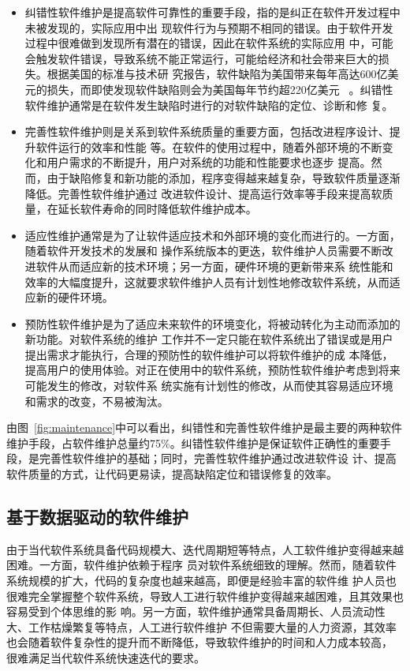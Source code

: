 \begin{itemize}
  \item 纠错性软件维护是提高软件可靠性的重要手段，指的是纠正在软件开发过程中未被发现的，实际应用中出
现软件行为与预期不相同的错误。由于软件开发过程中很难做到发现所有潜在的错误，因此在软件系统的实际应用
中，可能会触发软件错误，导致系统不能正常运行，可能给经济和社会带来巨大的损失。根据美国的标准与技术研
究报告，软件缺陷为美国带来每年高达600亿美元的损失，而即使发现软件缺陷则会为美国每年节约超220亿美元
~\cite{strate2013literature}。纠错性软件维护通常是在软件发生缺陷时进行的对软件缺陷的定位、诊断和修
复。
  \item 完善性软件维护则是关系到软件系统质量的重要方面，包括改进程序设计、提升软件运行的效率和性能
等。在软件的使用过程中，随着外部环境的不断变化和用户需求的不断提升，用户对系统的功能和性能要求也逐步
提高。然而，由于缺陷修复和新功能的添加，程序变得越来越复杂，导致软件质量逐渐降低。完善性软件维护通过
改进软件设计、提高运行效率等手段来提高软质量，在延长软件寿命的同时降低软件维护成本。
  \item 适应性维护通常是为了让软件适应技术和外部环境的变化而进行的。一方面，随着软件开发技术的发展和
操作系统版本的更迭，软件维护人员需要不断改进软件从而适应新的技术环境；另一方面，硬件环境的更新带来系
统性能和效率的大幅度提升，这就要求软件维护人员有计划性地修改软件系统，从而适应新的硬件环境。
  \item 预防性软件维护是为了适应未来软件的环境变化，将被动转化为主动而添加的新功能。对软件系统的维护
工作并不一定只能在软件系统出了错误或是用户提出需求才能执行，合理的预防性的软件维护可以将软件维护的成
本降低，提高用户的使用体验。对正在使用中的软件系统，预防性软件维护考虑到将来可能发生的修改，对软件系
统实施有计划性的修改，从而使其容易适应环境和需求的改变，不易被淘汰。
\end{itemize}

由图~\ref{fig:maintenance}中可以看出，纠错性和完善性软件维护是最主要的两种软件维护手段，占软件维护总量约75\%。纠错性软件维护是保证软件正确性的重要手段，是完善性软件维护的基础；同时，完善性软件维护通过改进软件设
计、提高软件质量的方式，让代码更易读，提高缺陷定位和错误修复的效率。

\subsection{基于数据驱动的软件维护}
由于当代软件系统具备代码规模大、迭代周期短等特点，人工软件维护变得越来越困难。一方面，软件维护依赖于程序
员对软件系统细致的理解。然而，随着软件系统规模的扩大，代码的复杂度也越来越高，即便是经验丰富的软件维
护人员也很难完全掌握整个软件系统，导致人工进行软件维护变得越来越困难，且其效果也容易受到个体思维的影
响。另一方面，软件维护通常具备周期长、人员流动性大、工作枯燥繁复等特点，人工进行软件维护
不但需要大量的人力资源，其效率也会随着软件复杂性的提升而不断降低，导致软件维护的时间和人力成本较高，
很难满足当代软件系统快速迭代的要求。

